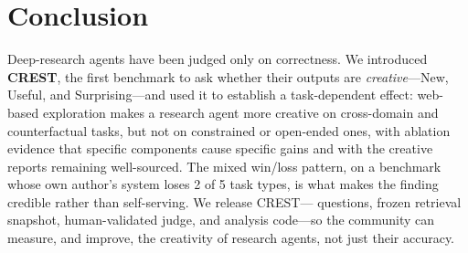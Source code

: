 \section{Conclusion}
\label{sec:conclusion}

Deep-research agents have been judged only on correctness. We introduced \textbf{CREST}, the first
benchmark to ask whether their outputs are \emph{creative}---New, Useful, and Surprising---and used
it to establish a task-dependent effect: web-based exploration makes a research agent more creative
on cross-domain and counterfactual tasks, but not on constrained or open-ended ones, with ablation
evidence that specific components cause specific gains and with the creative reports remaining
well-sourced. The mixed win/loss pattern, on a benchmark whose own author's system loses 2 of 5
task types, is what makes the finding credible rather than self-serving. We release CREST---
questions, frozen retrieval snapshot, human-validated judge, and analysis code---so the community
can measure, and improve, the creativity of research agents, not just their accuracy.
